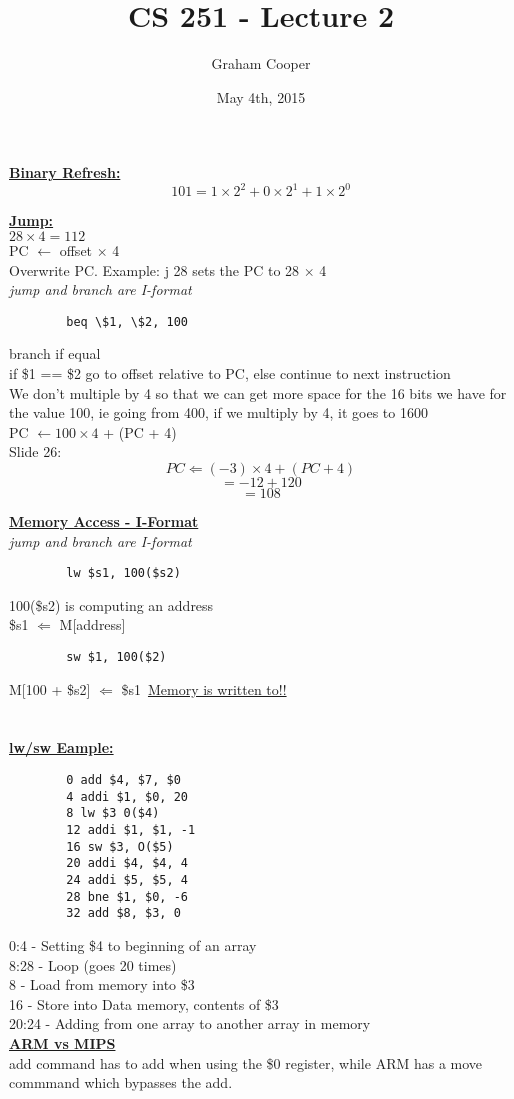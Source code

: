 \documentclass[12pt]{article}
\title{\vspace{-15ex}CS 251 - Lecture 2\vspace{-1ex}}
\date{May 4th, 2015}
\author{Graham Cooper}
\newcommand{\myt}[1]{\textbf{\underline{#1}}}
\begin{document}
	\maketitle
	
	\myt{Binary Refresh:}\\
	$$101 = 1 \times 2^2 + 0 \times 2^1 + 1 \times 2^0$$
	
	\myt{Jump:}\\
	$28 \times 4 = 112$\\
	PC $\leftarrow$ offset $\times$ 4\\
	Overwrite PC.
	Example: j 28 sets the PC to 28 $\times$ 4\\
	
	\emph{jump and branch are I-format}
	\lstset{language=[mips]Assembler}
	\begin{lstlisting}
		beq \$1, \$2, 100
	\end{lstlisting}
	branch if equal\\
	if \$1 == \$2 go to offset relative to PC, else continue to next instruction\\
	
	We don't multiple by 4 so that we can get more space for the 16 bits we have for the value 100, ie going from 400, if we multiply by 4, it goes to 1600\\
	
	PC $\leftarrow 100 \times 4$ + (PC + 4)\\
	
	Slide 26:
	$$PC \Leftarrow (-3) \times 4 + (PC + 4)$$
	$$ = -12 + 120$$
	$$ = 108$$
	
	\myt{Memory Access - I-Format}\\
	\emph{jump and branch are I-format}
	\lstset{language=[mips]Assembler}
	\begin{lstlisting}
		lw $s1, 100($s2)
	\end{lstlisting}
	100(\$s2) is computing an address\\
	\$s1 $\Leftarrow$ M[address]\\
	\lstset{language=[mips]Assembler}
	\begin{lstlisting}
		sw $1, 100($2)
	\end{lstlisting}
	M[100 + \$s2] $\Leftarrow$ \$s1\
	\underline{Memory is written to!!}\\\\\\
	
	\myt{lw/sw Eample:}\\
	\lstset{language=[mips]Assembler}
	\begin{lstlisting}
		0 add $4, $7, $0
		4 addi $1, $0, 20
		8 lw $3 0($4)
		12 addi $1, $1, -1
		16 sw $3, O($5)
		20 addi $4, $4, 4
		24 addi $5, $5, 4
		28 bne $1, $0, -6
		32 add $8, $3, 0
	\end{lstlisting}
	0:4 - Setting \$4 to beginning of an array\\
	8:28 - Loop (goes 20 times)\\
	8 -  Load from memory into \$3\\
	16 - Store into Data memory, contents of \$3\\
	20:24 - Adding from one array to another array in memory\\
	
	\myt{ARM vs MIPS}\\
	add command has to add when using the \$0 register, while ARM has a move commmand which bypasses the add.\\
	
	
\end{document}
